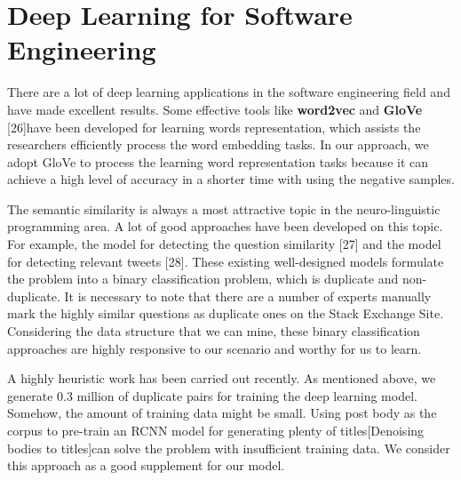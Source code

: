 \section{Deep Learning for Software Engineering}
There are a lot of deep learning applications in the software engineering field and have made excellent results. Some effective tools like {\bf word2vec} and {\bf GloVe} [26]have been developed for learning words representation, which assists the researchers efficiently process the word embedding tasks. In our approach, we adopt GloVe to process the learning word representation tasks because it can achieve a high level of accuracy in a shorter time with using the negative samples.
\par
The semantic similarity is always a most attractive topic in the neuro-linguistic programming area. A lot of good approaches have been developed on this topic. For example, the model for detecting the question similarity [27] and the model for detecting relevant tweets [28]. These existing well-designed models formulate the problem into a binary classification problem, which is duplicate and non-duplicate.
It is necessary to note that there are a number of experts manually mark the highly similar questions as duplicate ones on the Stack Exchange Site. Considering the data structure that we can mine, these binary classification approaches are highly responsive to our scenario and worthy for us to learn.
\par
A highly heuristic work has been carried out recently. As mentioned above, we generate 0.3 million of duplicate pairs for training the deep learning model. Somehow, the amount of training data might be small. Using post body as the corpus to pre-train an RCNN model for generating plenty of titles[Denoising bodies to titles]can solve the problem with insufficient training data. We consider this approach as a good supplement for our model.


